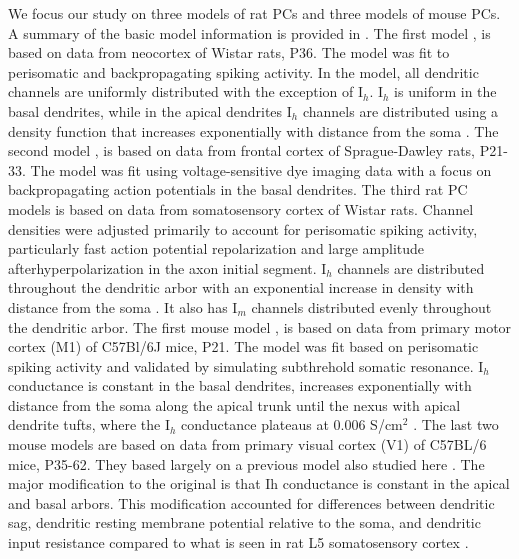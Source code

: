 \documentclass[utf8]{frontiersSCNS} %
\begin{document}
We focus our study on three models of rat PCs and three models of mouse PCs. A summary of the basic
model information is provided in \label{Table 1}.
The first model \citep{Hay2011-if}, is based on data from neocortex of Wistar rats, P36.  The model was fit to perisomatic
and backpropagating spiking activity.  In the model, all dendritic channels are uniformly distributed with the 
exception of I$_h$.  I$_h$ is uniform in the basal dendrites, while in the apical dendrites I$_h$ channels are
distributed using a density function that increases exponentially with distance from the soma 
\citep{Nevian2007-gw, Kole2006-bm}.
The second model \citep{Acker2009-yj}, is based on data from frontal cortex of 
Sprague-Dawley rats, P21-33.  The model was fit using voltage-sensitive dye imaging data with a focus on 
backpropagating action potentials in the basal dendrites.
The third rat PC models \citep{Kole2008-aj} is based on data from somatosensory cortex of Wistar rats. Channel 
densities were adjusted  primarily to account for perisomatic spiking activity, particularly fast action potential repolarization and 
large amplitude  afterhyperpolarization in the axon initial segment.  I$_h$ channels are distributed throughout 
the dendritic arbor with an exponential increase in density with distance from the soma \citep{Kole2006-bm}.
It also has I$_m$ channels distributed evenly throughout the dendritic arbor.
The first mouse model \citep{Neymotin2017-dr}, is based on data from primary motor cortex (M1) of C57Bl/6J mice, P21.  
The model was fit based on perisomatic spiking activity and validated by simulating subthrehold somatic resonance.  
I$_h$ conductance is constant in the basal dendrites, increases exponentially with distance from the soma along the apical
trunk until the nexus with apical dendrite tufts, where the I$_h$ conductance plateaus at 0.006 S/cm$^2$ \citep{Harnett2015-sj}.  
The last two mouse models \citep{Reimann2013-mg, Shai2015-ff, Markram2015-zg}
are based on data from primary visual cortex (V1) of C57BL/6 mice, P35-62. They based largely on a previous model also 
studied here \citep{Hay2011-if}.  The major modification to the original is that Ih conductance is constant in the apical and basal arbors.
This modification accounted for differences between dendritic sag, dendritic resting membrane potential relative 
to the soma, and dendritic input resistance compared to what is seen in rat L5 somatosensory cortex \citep{Shai2015-ff}.
\end{document}
